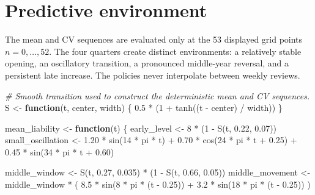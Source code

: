 \documentclass[
  10pt,
]{article}
\newenvironment{Shaded}{\begin{snugshade}}{\end{snugshade}}
\newcommand{\CommentTok}[1]{\textcolor[rgb]{0.56,0.35,0.01}{\textit{#1}}}
\newcommand{\ControlFlowTok}[1]{\textcolor[rgb]{0.13,0.29,0.53}{\textbf{#1}}}
\newcommand{\DecValTok}[1]{\textcolor[rgb]{0.00,0.00,0.81}{#1}}
\newcommand{\FloatTok}[1]{\textcolor[rgb]{0.00,0.00,0.81}{#1}}
\newcommand{\FunctionTok}[1]{\textcolor[rgb]{0.00,0.00,0.00}{#1}}
\newcommand{\NormalTok}[1]{#1}
\newcommand{\OtherTok}[1]{\textcolor[rgb]{0.56,0.35,0.01}{#1}}
\newcommand{\SpecialCharTok}[1]{\textcolor[rgb]{0.00,0.00,0.00}{#1}}
\begin{document}
\hypertarget{predictive-environment}{%
\section{Predictive environment}\label{predictive-environment}}

The mean and CV sequences are evaluated only at the 53 displayed grid
points \(n=0,\ldots,52\). The four quarters create distinct
environments: a relatively stable opening, an oscillatory transition, a
pronounced middle-year reversal, and a persistent late increase. The
policies never interpolate between weekly reviews.

\begin{Shaded}
\begin{Highlighting}[]
\CommentTok{\# Smooth transition used to construct the deterministic mean and CV sequences.}
\NormalTok{S }\OtherTok{\textless{}{-}} \ControlFlowTok{function}\NormalTok{(t, center, width) \{}
  \FloatTok{0.5} \SpecialCharTok{*}\NormalTok{ (}\DecValTok{1} \SpecialCharTok{+} \FunctionTok{tanh}\NormalTok{((t }\SpecialCharTok{{-}}\NormalTok{ center) }\SpecialCharTok{/}\NormalTok{ width))}
\NormalTok{\}}

\NormalTok{mean\_liability }\OtherTok{\textless{}{-}} \ControlFlowTok{function}\NormalTok{(t) \{}
\NormalTok{  early\_level }\OtherTok{\textless{}{-}} \DecValTok{8} \SpecialCharTok{*}\NormalTok{ (}\DecValTok{1} \SpecialCharTok{{-}} \FunctionTok{S}\NormalTok{(t, }\FloatTok{0.22}\NormalTok{, }\FloatTok{0.07}\NormalTok{))}
\NormalTok{  small\_oscillation }\OtherTok{\textless{}{-}}
    \FloatTok{1.20} \SpecialCharTok{*} \FunctionTok{sin}\NormalTok{(}\DecValTok{14} \SpecialCharTok{*}\NormalTok{ pi }\SpecialCharTok{*}\NormalTok{ t) }\SpecialCharTok{+}
    \FloatTok{0.70} \SpecialCharTok{*} \FunctionTok{cos}\NormalTok{(}\DecValTok{24} \SpecialCharTok{*}\NormalTok{ pi }\SpecialCharTok{*}\NormalTok{ t }\SpecialCharTok{+} \FloatTok{0.25}\NormalTok{) }\SpecialCharTok{+}
    \FloatTok{0.45} \SpecialCharTok{*} \FunctionTok{sin}\NormalTok{(}\DecValTok{34} \SpecialCharTok{*}\NormalTok{ pi }\SpecialCharTok{*}\NormalTok{ t }\SpecialCharTok{+} \FloatTok{0.60}\NormalTok{)}

\NormalTok{  middle\_window }\OtherTok{\textless{}{-}} \FunctionTok{S}\NormalTok{(t, }\FloatTok{0.27}\NormalTok{, }\FloatTok{0.035}\NormalTok{) }\SpecialCharTok{*}\NormalTok{ (}\DecValTok{1} \SpecialCharTok{{-}} \FunctionTok{S}\NormalTok{(t, }\FloatTok{0.66}\NormalTok{, }\FloatTok{0.05}\NormalTok{))}
\NormalTok{  middle\_movement }\OtherTok{\textless{}{-}}\NormalTok{ middle\_window }\SpecialCharTok{*}\NormalTok{ (}
    \FloatTok{8.5} \SpecialCharTok{*} \FunctionTok{sin}\NormalTok{(}\DecValTok{8} \SpecialCharTok{*}\NormalTok{ pi }\SpecialCharTok{*}\NormalTok{ (t }\SpecialCharTok{{-}} \FloatTok{0.25}\NormalTok{)) }\SpecialCharTok{+}
    \FloatTok{3.2} \SpecialCharTok{*} \FunctionTok{sin}\NormalTok{(}\DecValTok{18} \SpecialCharTok{*}\NormalTok{ pi }\SpecialCharTok{*}\NormalTok{ (t }\SpecialCharTok{{-}} \FloatTok{0.25}\NormalTok{))}
\NormalTok{  )}


\end{Highlighting}
\end{Shaded}
\end{document}
